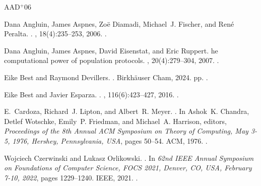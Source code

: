 \documentclass[11pt,a4paper]{amsart}
\theoremstyle{plain}
\theoremstyle{definition}
\theoremstyle{defC}
\theoremstyle{thmC}
\begin{document}
\newcommand{\etalchar}[1]{$^{#1}$}
\begin{thebibliography}{AAD{\etalchar{+}}06}

\bibitem[AAD{\etalchar{+}}06]{DBLP:journals/dc/AngluinADFP06}
Dana Angluin, James Aspnes, Zo{\"{e}} Diamadi, Michael~J. Fischer, and
  Ren{\'{e}} Peralta.
.
, 18(4):235--253, 2006.
\newblock \href {https://doi.org/10.1007/s00446-005-0138-3}
  {}.

Dana Angluin, James Aspnes, David Eisenstat, and Eric Ruppert.
he computational power of population protocols.
, 20(4):279--304, 2007.
\newblock \href {https://doi.org/10.1007/s00446-007-0040-2}
  {}.

Eike Best and Raymond Devillers.
.
\newblock Birkh\"auser Cham, 2024.
 pp.
\newblock \href {https://doi.org/10.1007/978-3-031-48278-6}
  {}.

Eike Best and Javier Esparza.
.
, 116(6):423--427, 2016.
\newblock \href {https://doi.org/10.1016/j.ipl.2016.01.011}
  {}.

E.~Cardoza, Richard~J. Lipton, and Albert~R. Meyer.
.
\newblock In Ashok~K. Chandra, Detlef Wotschke, Emily~P. Friedman, and
  Michael~A. Harrison, editors, {\em Proceedings of the 8th Annual {ACM}
  Symposium on Theory of Computing, May 3-5, 1976, Hershey, Pennsylvania,
  {USA}}, pages 50--54. {ACM}, 1976.
\newblock \href {https://doi.org/10.1145/800113.803630}
  {}.

Wojciech Czerwinski and Lukasz Orlikowski.
.
\newblock In {\em 62nd {IEEE} Annual Symposium on Foundations of Computer
  Science, {FOCS} 2021, Denver, CO, USA, February 7-10, 2022}, pages
  1229--1240. {IEEE}, 2021.
\newblock \href {https://doi.org/10.1109/FOCS52979.2021.00120}
  {}.


\end{thebibliography}
\end{document}
